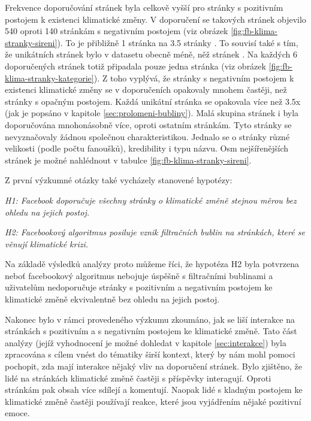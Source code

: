 Frekvence doporučování stránek byla celkově vyšší pro stránky s pozitivním postojem k existenci klimatické změny. V doporučení se takových stránek objevilo 540 oproti 140 stránkám s negativním postojem (viz obrázek \ref{fig:fb-klima-stranky-sireni}). To je přibližně 1 stránka  na 3.5 stránky . To souvisí také s tím, že unikátních stránek  bylo v datasetu obecně méně, něž stránek . Na každých 6 doporučených stránek  totiž připadala pouze jedna stránka  (viz obrázek \ref{fig:fb-klima-stranky-kategorie}). Z toho vyplývá, že stránky s negativním postojem k existenci klimatické změny se v doporučeních opakovaly mnohem častěji, než stránky s opačným postojem. Každá unikátní stránka  se opakovala více než 3.5x (jak je popsáno v kapitole \ref{sec:prolomeni-bubliny}). Malá skupina stránek  i  byla doporučována mnohonásobně více, oproti ostatním stránkám. Tyto stránky se nevyznačovaly žádnou společnou charakteristikou. Jednalo se o stránky různé velikosti (podle počtu fanoušků), kredibility i typu názvu. Osm nejšířenějších stránek je možné nahlédnout v tabulce \ref{fig:fb-klima-stranky-sireni}.  

Z první výzkumné otázky také vycházely stanovené hypotézy:

   \setlength\parskip{5mm}
   
    \emph{H1: Facebook doporučuje všechny stránky o klimatické změně stejnou měrou bez ohledu na jejich postoj.}
    
    \setlength\parskip{0mm}

    \emph{H2: Facebookový algoritmus posiluje vznik filtračních bublin na stránkách, které se věnují klimatické krizi.}
    
    \setlength\parskip{5mm}
   
Na základě výsledků analýzy proto můžeme říci, že hypotéza H2 byla potvrzena neboť facebookový algoritmus nebojuje úspěšně s filtračními bublinami a uživatelům nedoporučuje stránky s pozitivním a negativním postojem ke klimatické změně ekvivalentně bez ohledu na jejich postoj. 
\setlength\parskip{0mm}

Nakonec bylo v rámci provedeného výzkumu zkoumáno, jak se liší interakce na stránkách s pozitivním a s negativním postojem ke klimatické změně. Tato část analýzy (jejíž vyhodnocení je možné dohledat v kapitole \ref{sec:interakce}) byla zpracována s cílem vnést do tématiky širší kontext, který by nám mohl pomoci pochopit, zda mají interakce nějaký vliv na doporučení stránek. Bylo zjištěno, že lidé na stránkách  klimatické změně častěji s příspěvky interagují. Oproti stránkám  pak obsah více sdílejí a komentují. Naopak lidé s kladným postojem ke klimatické změně častěji používají reakce, které jsou vyjádřením nějaké pozitivní emoce. 


